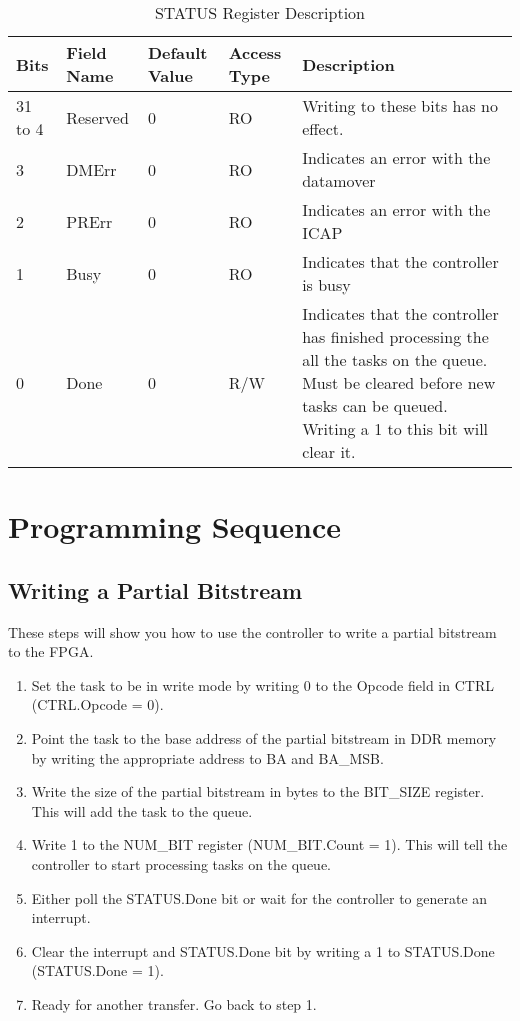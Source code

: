 \documentclass{report}
\begin{document}
\begin{table}[H]
    \centering
    \caption{STATUS Register Description}
    \label{my-label}
    \begin{tabular}{|l|l|l|l|p{}|}
        \hline
        \textbf{Bits} & \textbf{Field Name} & \textbf{Default Value} & \textbf{Access Type} & \textbf{Description} \\ \hline
            31 to 4  &     Reserved                &   0                     & RO                     & Writing to these bits has no effect.                      \\ \hline
            3 &       DMErr              & 0                       & RO                     & Indicates an error with the datamover \\ \hline
            2 &       PRErr              & 0                       & RO                     & Indicates an error with the ICAP      \\ \hline
            1 &       Busy               & 0                       & RO                     & Indicates that the controller is busy  \\ \hline
            0 &       Done              & 0                       & R/W                     & Indicates that the controller has finished processing the all the tasks on the queue. Must be cleared before new tasks can be queued. Writing a 1 to this bit will clear it. \\ \hline
    \end{tabular}
\end{table}
\section*{Programming Sequence}
\subsection*{Writing a Partial Bitstream}
These steps will show you how to use the controller to write a partial bitstream to the FPGA. 
\begin{enumerate}
	\item Set the task to be in write mode by writing 0 to the Opcode field in CTRL (CTRL.Opcode = 0).
	\item Point the task to the base address of the partial bitstream in DDR memory by writing the appropriate address to BA and BA\_MSB.
	\item Write the size of the partial bitstream in bytes to the BIT\_SIZE register. This will add the task to the queue.
	\item Write 1 to the NUM\_BIT register (NUM\_BIT.Count = 1). This will tell the controller to start processing tasks on the queue.
	\item Either poll the STATUS.Done bit or wait for the controller to generate an interrupt.
	\item Clear the interrupt and STATUS.Done bit by writing a 1 to STATUS.Done (STATUS.Done = 1).
	\item Ready for another transfer. Go back to step 1.
\end{enumerate}
\end{document}
